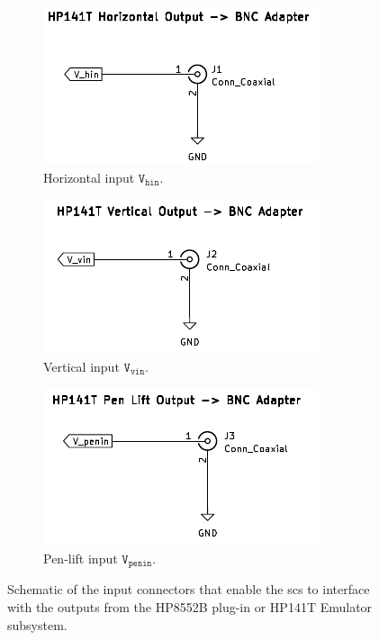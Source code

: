 \documentclass[class=report,11pt,crop=false]{standalone}
\begin{document}
	\begin{figure}[h!]
		\centering
		\begin{subfigure}{.33\textwidth}
			\centering
			\includegraphics[width=.8\linewidth]{Figures/Methodology/sig-cond-bnc-ct-schematic-j1}
			\caption{Horizontal input $\texttt{V}_\texttt{hin}$.}
			\label{fig:sig-cond-bnc-j1}
		\end{subfigure}
		\begin{subfigure}{.33\textwidth}
			\centering
			\includegraphics[width=.8\linewidth]{Figures/Methodology/sig-cond-bnc-ct-schematic-j2}
			\caption{Vertical input $\texttt{V}_\texttt{vin}$.}
			\label{fig:sig-cond-bnc-j2}
		\end{subfigure}
		\begin{subfigure}{.33\textwidth}
			\centering
			\includegraphics[width=.8\linewidth]{Figures/Methodology/sig-cond-bnc-ct-schematic-j3}
			\caption{Pen-lift input $\texttt{V}_\texttt{penin}$.}
			\label{fig:sig-cond-bnc-j3}
		\end{subfigure}
		\caption{Schematic of the input connectors that enable the \acrshort{scs} to interface with the outputs from the HP8552B plug-in or HP141T Emulator subsystem.}
		\label{fig:sig-cond-bnc-ct-schematic}
	\end{figure}
\end{document}
